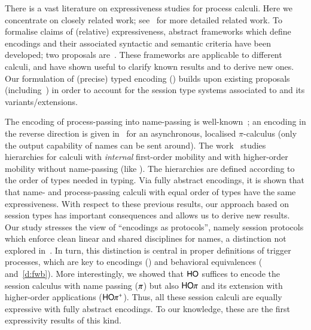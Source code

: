There is a vast literature on expressiveness studies for process calculi. 
Here we concentrate on closely related work; 
see~\cite{KouzapasPY15} for more detailed related work. 
To formalise claims of (relative) expressiveness,
abstract frameworks which define encodings and their 
associated syntactic and semantic criteria 
have been developed; 
two proposals are~\cite{DBLP:journals/iandc/Gorla10,DBLP:journals/tcs/FuL10}. 
These frameworks are applicable to different calculi, and 
have shown useful to clarify known results and to derive new ones.
Our formulation of (precise) typed encoding () 
builds upon existing proposals (including~\cite{Palamidessi03,DBLP:journals/iandc/Gorla10,DBLP:conf/icalp/LanesePSS10})
in order to account for the session type systems
associated to \HOp and its variants/extensions.

The encoding of process-passing into name-passing is well-known~\cite{SangiorgiD:expmpa};
an encoding in the reverse direction 
is given in~\cite{SaWabook} for an asynchronous, localised $\pi$-calculus
(only the output capability of names can be sent around).  The
work~\cite{San96int} studies hierarchies for calculi with
\emph{internal} first-order mobility and with higher-order mobility
without name-passing (like \HO). The
hierarchies are %
defined according to
the order of types needed in typing. 
Via fully abstract encodings, it is shown that that
name- and process-passing calculi with equal order of types have the
same expressiveness.  With respect to these previous results, our
approach based on session types has important consequences and
allows us to derive new results.  
Our study stresses the 
view of ``encodings as protocols'', namely session protocols which
enforce clean linear and shared disciplines for names, a distinction
not explored in~\cite{SangiorgiD:expmpa,DBLP:journals/tcs/Sangiorgi01}. In
turn, this distinction is central in proper definitions
of trigger processes, which are key to encodings
() and behavioral equivalences
( and~\ref{d:fwb}).  More interestingly, we showed that
$\mathsf{HO}$ suffices to encode  the session
calculus with name passing ($\pi$) but also $\mathsf{HO}\pi$ and its extension with
higher-order applications ($\mathsf{HO\pi^{+}}$). 
Thus, %
all these session calculi are equally expressive with fully
abstract encodings.  To our knowledge, these are the first
expressivity results of this kind.

